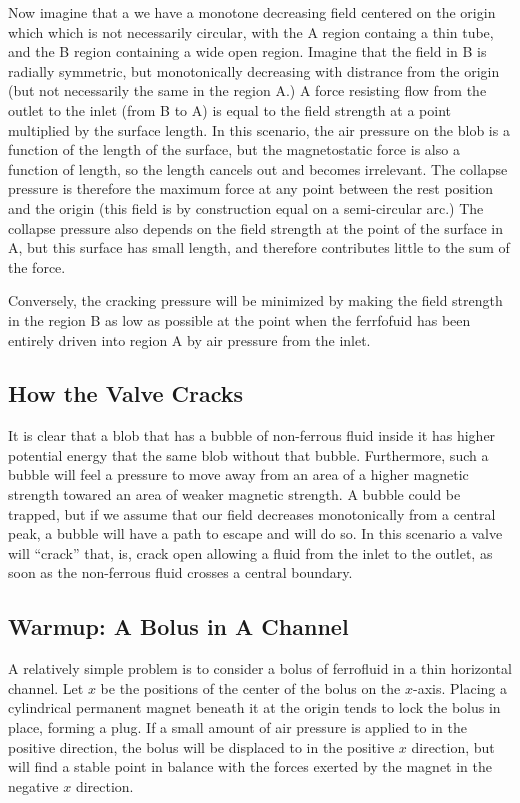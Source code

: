 \documentclass{asme2ej}
\begin{document}
Now imagine that a we have a monotone decreasing field centered
on the origin which which is not necessarily circular, with
the A region containg a thin tube, and the B region containing
a wide open region. Imagine that the field in B is radially
symmetric, but monotonically decreasing with distrance from
the origin (but not necessarily the same in the region A.)
A force resisting flow from the outlet to the inlet (from B to A)
is equal to the field strength at a point multiplied by the surface
length.
In this scenario, the air pressure on the blob is a function
of the length of the surface, but the magnetostatic force is
also a function of length, so the length cancels out and becomes
irrelevant.
The collapse pressure is therefore the maximum force at any point between the rest position and the origin
(this field is by construction equal on a semi-circular arc.)
The collapse pressure also depends on the field strength
at the point of the surface in A, but this surface has small length,
and therefore contributes little to the sum of the force.

Conversely, the cracking pressure will be minimized by
making the field strength in the region B as low as possible
at the point when the ferrfofuid has been entirely driven into
region A by air pressure from the inlet.

\subsection{How the Valve Cracks}

It is clear that a blob that has a bubble of non-ferrous fluid inside it
has higher potential energy that the same blob without that bubble.
Furthermore, such a bubble will feel a pressure to move away from
an area of a higher magnetic strength towared an area of weaker magnetic
strength. A bubble could be trapped, but if we assume that our
field decreases monotonically from a central peak, a bubble
will have a path to escape and will do so.
In this scenario a valve will ``crack'' that, is, crack open
allowing a fluid from the inlet to the outlet, as soon as the
non-ferrous fluid crosses a central boundary.


\subsection{Warmup: A Bolus in A Channel}

A relatively simple problem is to consider a bolus of
ferrofluid in a thin horizontal channel. Let $x$ be the positions of the center of
the bolus on the $x$-axis.
Placing a cylindrical permanent
magnet beneath it at the origin tends to lock the bolus in place,
forming a plug.
If a small amount of air pressure is applied to in the positive direction,
the bolus will
be displaced to in the positive $x$ direction, but will find a
stable point in balance with the forces exerted by the magnet in
the negative $x$ direction.
\end{document}
